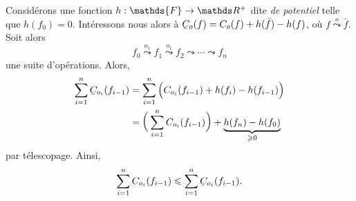 \documentclass[a4paper]{article}
\begin{document}
	\begin{met}[du potentiel]
		Considérons une fonction $h : \mathds{F} \to \R^+$\/ dite \textit{de potentiel} telle que $h(f_0) = 0$.
		Intéressons nous alors à $\ubar{C}_o(f) = C_o(f) + h(\bar{f}) - h(f)$, où $f \overset o\leadsto \bar{f}$.
		Soit alors \[
			f_0 \overset{o_1}\leadsto f_1 \overset{o_1}\leadsto f_2 \leadsto \cdots \leadsto f_n
		\]une suite d'opérations. Alors,
		\begin{align*}
			\sum_{i=1}^n \ubar{C}_{o_i}(f_{i-1}) &= \sum_{i=1}^n \Big(C_{o_i}(f_{i-1}) + h(f_i) - h(f_{i-1})\Big)\\
			&= \bigg(\sum_{i=1}^n C_{o_i}(f_{i-1})\bigg) + \underbrace{h(f_n) - h(f_0)}_{\ge  0} \\
		\end{align*}
		par télescopage. Ainsi, \[
			\sum_{i=1}^n C_{o_i}(f_{i-1}) \le \sum_{i=1}^n \ubar{C}_{o_i}(f_{i-1})
		.\]
	\end{met}
\end{document}
